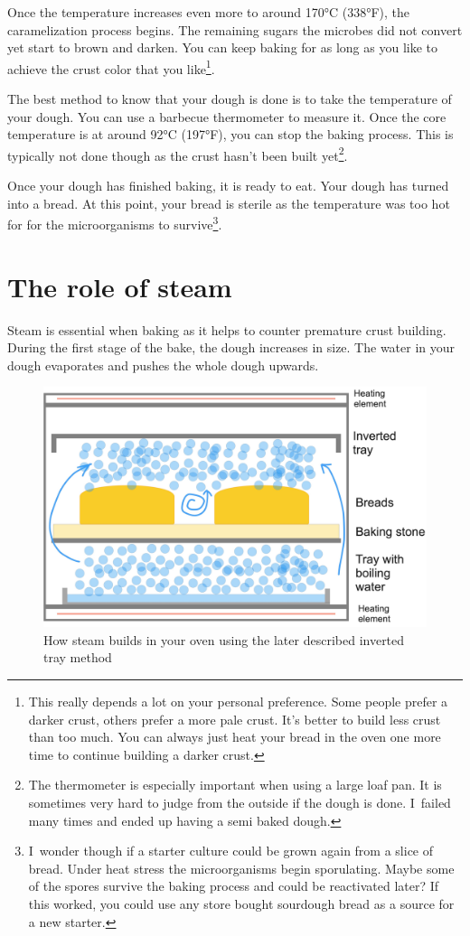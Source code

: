 Once the temperature increases even more to around 170°C (338°F),
the caramelization process begins. The remaining sugars the microbes
did not convert yet start to brown and darken. You can keep baking
for as long as you like to achieve the crust color that you
like\footnote{This really depends a lot on your personal preference.
Some people prefer a darker crust, others prefer a more pale crust.
It's better to build less crust than too much. You can always just
heat your bread in the oven one more time to continue building a
darker crust.}.

The best method to know that your dough is done is to take
the temperature of your dough. You can use a barbecue thermometer
to measure it. Once the core temperature is at around 92°C (197°F),
you can stop the baking process. This is typically not done though
as the crust hasn't been built yet\footnote{The thermometer is
especially important when using a large loaf pan. It is sometimes
very hard to judge from the outside if the dough is done. I~failed
many times and ended up having a semi baked dough.}.

Once your dough has finished baking, it is ready to eat. Your
dough has turned into a bread. At this
point, your bread is sterile as the temperature was too hot for
for the microorganisms to survive\footnote{I~wonder though
if a starter culture could be grown again from a slice of bread.
Under heat stress the microorganisms begin sporulating. Maybe
some of the spores survive the baking process and could be reactivated
later? If this worked, you could use any store bought sourdough
bread as a source for a new starter.}.

\section{The role of steam}

Steam is essential when baking as it helps to counter premature
crust building. During the first stage of the bake, the dough
increases in size. The water in your dough evaporates and pushes
the whole dough upwards.

\begin{figure}[!htb]
  \includegraphics[width=\textwidth]{baking-process-steam.jpg}
  \caption{How steam builds in your oven using the later described
  inverted tray method}
\end{figure}

